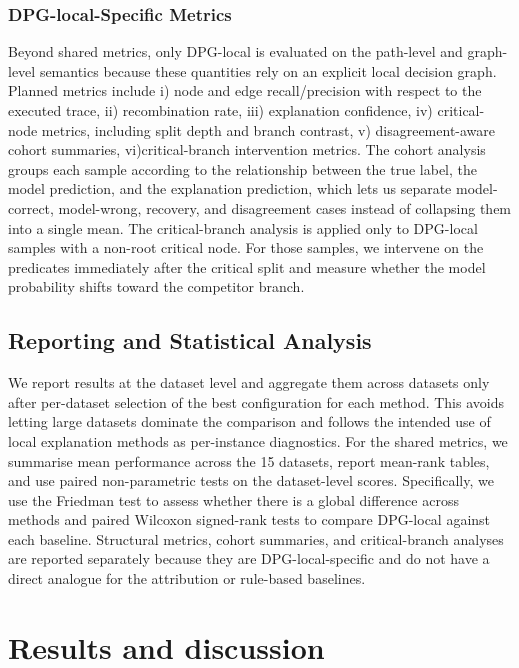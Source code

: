 \documentclass[runningheads]{llncs}
\begin{document}
\subsubsection{DPG-local-Specific Metrics}
Beyond shared metrics, only DPG-local is evaluated on the path-level
and graph-level semantics because these quantities rely on an explicit local decision graph. Planned metrics include 
i) node and edge recall/precision with respect to the executed trace,
ii) recombination rate,
iii) explanation confidence,
iv) critical-node metrics, including split depth and branch contrast,
v) disagreement-aware cohort summaries,
vi)critical-branch intervention metrics. 
The cohort analysis groups each sample according to the relationship between the true label, the model prediction, and the explanation prediction, which lets us separate model-correct, model-wrong, recovery, and disagreement cases instead of collapsing them into a single mean. The critical-branch analysis is applied only to DPG-local samples with a non-root critical node. For those samples, we intervene on the predicates immediately after the critical split and measure whether the model probability shifts toward the competitor branch.

\subsection{Reporting and Statistical Analysis}

We report results at the dataset level and aggregate them across datasets only
after per-dataset selection of the best configuration for each method. This
avoids letting large datasets dominate the comparison and follows the intended
use of local explanation methods as per-instance diagnostics.
For the shared metrics, we summarise mean performance across the 15 datasets, report mean-rank tables, and use paired non-parametric tests on the dataset-level scores. Specifically, we use the Friedman test to assess whether there is a global difference across methods and paired Wilcoxon signed-rank tests to compare DPG-local against each baseline. Structural metrics, cohort summaries, and critical-branch analyses are reported separately because they are DPG-local-specific and do not have a direct analogue for the
attribution or rule-based baselines.

\section{Results and discussion}\label{sec:results}
\end{document}
